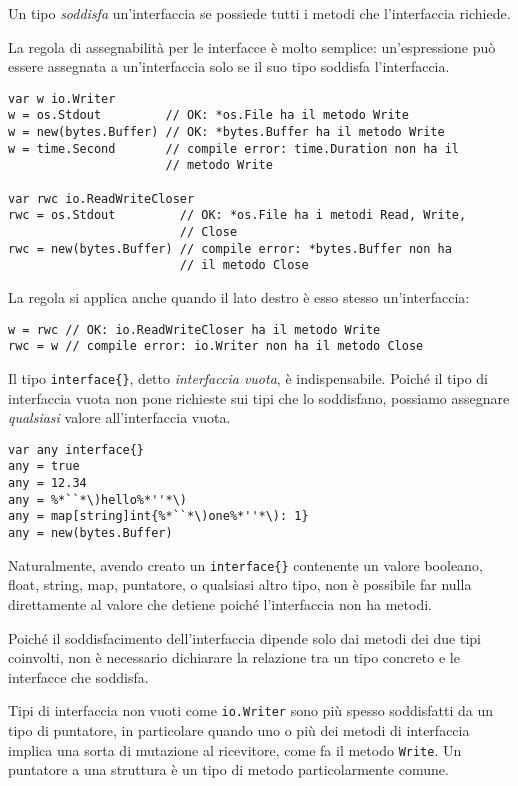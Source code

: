 %
Un tipo \textit{soddisfa} un'interfaccia se possiede tutti i metodi che l'interfaccia richiede.

La regola di assegnabilità per le interfacce è molto semplice: un'espressione può essere assegnata a un'interfaccia solo se il suo tipo soddisfa l'interfaccia.
\begin{lstlisting}[frame=single, label={lst:lstlisting6-3.1}]
var w io.Writer
w = os.Stdout         // OK: *os.File ha il metodo Write
w = new(bytes.Buffer) // OK: *bytes.Buffer ha il metodo Write
w = time.Second       // compile error: time.Duration non ha il
                      // metodo Write

var rwc io.ReadWriteCloser
rwc = os.Stdout         // OK: *os.File ha i metodi Read, Write,
                        // Close
rwc = new(bytes.Buffer) // compile error: *bytes.Buffer non ha
                        // il metodo Close
\end{lstlisting}
La regola si applica anche quando il lato destro è esso stesso un'interfaccia:
\begin{lstlisting}[frame=single, label={lst:lstlisting6-3.2}]
w = rwc // OK: io.ReadWriteCloser ha il metodo Write
rwc = w // compile error: io.Writer non ha il metodo Close
\end{lstlisting}
Il tipo \verb|interface{}|, detto \textit{interfaccia vuota}, è indispensabile.
Poiché il tipo di interfaccia vuota non pone richieste sui tipi che lo soddisfano, possiamo assegnare \textit{qualsiasi} valore all'interfaccia vuota.
\begin{lstlisting}[frame=single, label={lst:lstlisting6-3.3}]
var any interface{}
any = true
any = 12.34
any = %*``*\)hello%*''*\)
any = map[string]int{%*``*\)one%*''*\): 1}
any = new(bytes.Buffer)
\end{lstlisting}
Naturalmente, avendo creato un \verb|interface{}| contenente un valore booleano, float, string, map, puntatore, o qualsiasi altro tipo, non è possibile far nulla direttamente al valore che detiene poiché l'interfaccia non ha metodi.

Poiché il soddisfacimento dell'interfaccia dipende solo dai metodi dei due tipi coinvolti, non è necessario dichiarare la relazione tra un tipo concreto e le interfacce che soddisfa.

Tipi di interfaccia non vuoti come \verb|io.Writer| sono più spesso soddisfatti da un tipo di puntatore, in particolare quando uno o più dei metodi di interfaccia implica una sorta di mutazione al ricevitore, come fa il metodo \verb|Write|.
Un puntatore a una struttura è un tipo di metodo particolarmente comune.

